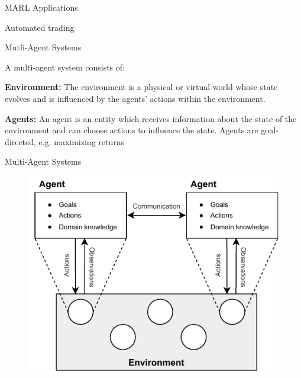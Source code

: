\begin{frame}[t]{MARL Applications}
\begin{minipage}{.5\linewidth}
        Automated trading
    \end{minipage}

\end{frame}

\begin{frame}{Mutli-Agent Systems}
	\begin{graytitlebox}{A multi-agent system consists of:}
    \blist
        \item<1-> \textbf{Environment:} The environment is a physical or virtual world whose state evolves and is influenced by the agents' actions within the environment.
        
        \item<2-> \textbf{Agents:} An agent is an entity which receives information about the state of the environment and can choose actions to influence the state.
        \listtab Agents are goal-directed, e.g. maximizing returns
    \elist
    \end{graytitlebox}
\end{frame}

\begin{frame}{Multi-Agent Systems}		
    \begin{figure}
        \centering
        \includegraphics[width=\textwidth,height=.9\textheight,keepaspectratio]{images/chapter_1/mas_schematic.pdf}
        \label{fig:enter-label}
    \end{figure}
\end{frame}


